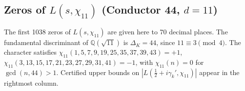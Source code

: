 \documentclass[12pt,reqno]{amsart}
\theoremstyle{remark}
\newcommand{\Q}{\mathbb{Q}}
\begin{document}
\subsection{Zeros of \texorpdfstring{$L(s,\chi_{11})$}{L(s,chi11)} (Conductor 44, \texorpdfstring{$d = 11$}{d=11})}
\label{subsec:chi11}

The first 1038 zeros of $L(s,\chi_{11})$ are given here to 70 decimal places.  The fundamental discriminant of $\Q(\sqrt{11})$ is $\Delta_K = 44$, since $11 \equiv 3 \pmod{4}$.  The character satisfies $\chi_{11}(1,5,7,9,19,25,35,37,39,43) = +1$, $\chi_{11}(3,13,15,17,21,23,27,29,31,41) = -1$, with $\chi_{11}(n) = 0$ for $\gcd(n,44) > 1$.  Certified upper bounds on $|L(\tfrac{1}{2}+i\gamma_k',\chi_{11})|$ appear in the rightmost column.
\end{document}
